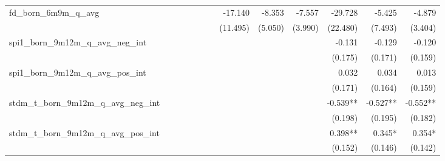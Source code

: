 \begin{tabular}{lrrrrrrrrrrrr}
fd\_born\_6m9m\_q\_avg                      &              &              &              &              &              &              &      -17.140 &       -8.353 &       -7.557 &      -29.728 &       -5.425 &       -4.879 \\ 
                                            &              &              &              &              &              &              &     (11.495) &      (5.050) &      (3.990) &     (22.480) &      (7.493) &      (3.404) \\ 
spi1\_born\_9m12m\_q\_avg\_neg\_int         &              &              &              &              &              &              &              &              &              &       -0.131 &       -0.129 &       -0.120 \\ 
                                            &              &              &              &              &              &              &              &              &              &      (0.175) &      (0.171) &      (0.159) \\ 
spi1\_born\_9m12m\_q\_avg\_pos\_int         &              &              &              &              &              &              &              &              &              &        0.032 &        0.034 &        0.013 \\ 
                                            &              &              &              &              &              &              &              &              &              &      (0.171) &      (0.164) &      (0.159) \\ 
stdm\_t\_born\_9m12m\_q\_avg\_neg\_int      &              &              &              &              &              &              &              &              &              &     -0.539** &     -0.527** &     -0.552** \\ 
                                            &              &              &              &              &              &              &              &              &              &      (0.198) &      (0.195) &      (0.182) \\ 
stdm\_t\_born\_9m12m\_q\_avg\_pos\_int      &              &              &              &              &              &              &              &              &              &      0.398** &       0.345* &       0.354* \\ 
                                            &              &              &              &              &              &              &              &              &              &      (0.152) &      (0.146) &      (0.142) \\ 

\end{tabular}
